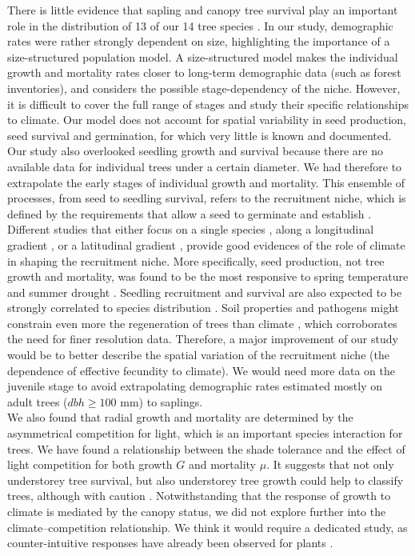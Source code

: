 There is little evidence that sapling and canopy tree survival play an
important role in the distribution of 13 of our 14 tree species
\citep[\textit{Picea mariana} is missing]{Canham2017}. In our study,
demographic rates were rather strongly dependent on size, highlighting the
importance of a size-structured population model. A size-structured model
makes the individual growth and mortality rates closer to long-term
demographic data (such as forest inventories), and considers the possible
stage-dependency of the niche. However, it is difficult to cover the full
range of stages and study their specific relationships to climate. Our model
does not account for spatial variability in seed production, seed survival and
germination, for which very little is known and documented. Our study also
overlooked seedling growth and survival because there are no available
data for individual trees under a certain diameter. We had therefore to
extrapolate the early stages of individual growth and mortality. This ensemble
of processes, from seed to seedling survival, refers to the recruitment niche,
which is defined by the requirements that allow a seed to germinate and
establish \citep{Valdez2019}. Different studies that either focus on a single
species \citep[\textit{Acer saccharum}]{Solarik2016}, along a longitudinal
gradient \citep{CLARK2011}, or a latitudinal gradient \citep {Boisvert-Marsh2019}, provide good evidences of the role of climate in shaping the
recruitment niche. More specifically, seed production, not tree growth and
mortality, was found to be the most responsive to spring temperature and
summer drought \citep[11 sites in the Appalachians, Piedmont, and North Carolina]{CLARK2011}. Seedling recruitment and survival are also expected to
be strongly correlated to species distribution \citep{Vanderwel2013, Valdez2019, Solarik2019}. Soil properties and pathogens might constrain even
more the regeneration of trees than climate \citep{Brown2014}, which
corroborates the need for finer resolution data. Therefore, a major
improvement of our study would be to better describe the spatial variation of
the recruitment niche (\ie the dependence of effective fecundity to climate).
We would need more data on the juvenile stage to avoid extrapolating
demographic rates estimated mostly on adult trees ($ dbh \geqslant 100 $ mm)
to saplings. \\

We also found that radial growth and mortality are determined by the
asymmetrical competition for light, which is an important species interaction
for trees. We have found a relationship between the shade tolerance and the
effect of light competition for both growth $ G $ and mortality $ \mu $. It
suggests that not only understorey tree survival, but also understorey tree
growth could help to classify trees, although with caution \citep{Feng2018}.
Notwithstanding that the response of growth to climate is mediated by the
canopy status, we did not explore further into the climate--competition
relationship. We think it would require a dedicated study, as counter-intuitive responses have already been observed for plants
\citep{Holmgren2012}. \\

